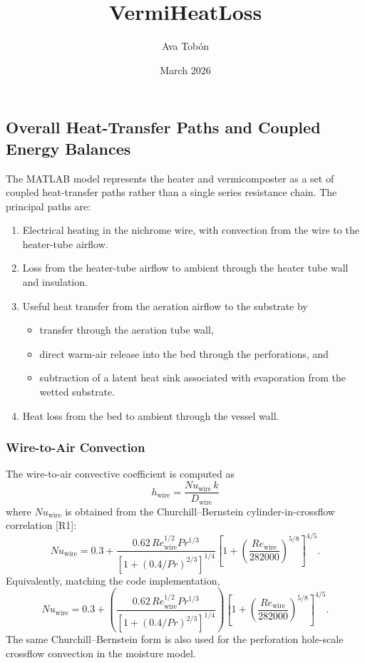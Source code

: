 \documentclass{article}
\title{VermiHeatLoss}
\author{Ava Tob\'on}
\date{March 2026}
\begin{document}
\subsection{Overall Heat-Transfer Paths and Coupled Energy Balances}

The MATLAB model represents the heater and vermicomposter as a set of coupled
heat-transfer paths rather than a single series resistance chain. The
principal paths are:

\begin{enumerate}
\item Electrical heating in the nichrome wire, with convection from the wire
      to the heater-tube airflow.
\item Loss from the heater-tube airflow to ambient through the heater tube
      wall and insulation.
\item Useful heat transfer from the aeration airflow to the substrate by
      \begin{itemize}
      \item transfer through the aeration tube wall,
      \item direct warm-air release into the bed through the perforations, and
      \item subtraction of a latent heat sink associated with evaporation from
            the wetted substrate.
      \end{itemize}
\item Heat loss from the bed to ambient through the vessel wall.
\end{enumerate}

\subsubsection{Wire-to-Air Convection}

The wire-to-air convective coefficient is computed as
\begin{equation}
h_{\text{wire}}=\frac{Nu_{\text{wire}}\,k}{D_{\text{wire}}}
\end{equation}
where $Nu_{\text{wire}}$ is obtained from the Churchill--Bernstein
cylinder-in-crossflow correlation [R1]:
\begin{equation}
Nu_{\text{wire}}
=
0.3+
\frac{0.62\,Re_{\text{wire}}^{1/2}Pr^{1/3}}
{\left[1+\left(0.4/Pr\right)^{2/3}\right]^{1/4}}
\left[1+\left(\frac{Re_{\text{wire}}}{282000}\right)^{5/8}\right]^{4/5}.
\end{equation}
Equivalently, matching the code implementation,
\begin{equation}
Nu_{\text{wire}}
=
0.3+
\left(
\frac{0.62\,Re_{\text{wire}}^{1/2}Pr^{1/3}}
{\left[1+\left(0.4/Pr\right)^{2/3}\right]^{1/4}}
\right)
\left[1+\left(\frac{Re_{\text{wire}}}{282000}\right)^{5/8}\right]^{4/5}.
\end{equation}
The same Churchill--Bernstein form is also used for the perforation
hole-scale crossflow convection in the moisture model.
\end{document}

